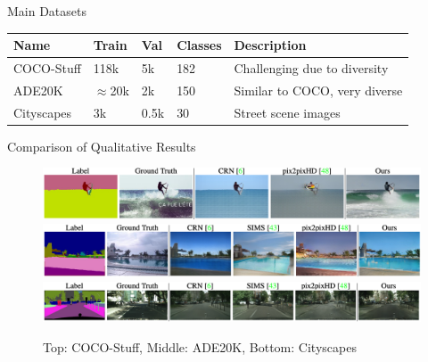 \documentclass{beamer}
\begin{document}
\begin{frame}{Main Datasets}
    \begin{table}[]
    \begin{tabular}{|l|l|l|l|l|}
    \hline
    \textbf{Name} & \textbf{Train} & \textbf{Val} & \textbf{Classes} & \textbf{Description}             \\ \hline
    COCO-Stuff    & 118k           & 5k           & 182              & Challenging due to diversity \\ \hline
    ADE20K        & $\approx$20k          & 2k           & 150              & Similar to COCO, very diverse    \\ \hline
    Cityscapes    & 3k             & 0.5k          & 30               & Street scene images              \\ \hline
    \end{tabular}
    \end{table}
\end{frame}

\begin{frame}{Comparison of Qualitative Results}
    \begin{figure}
        \centering
        \includegraphics[width=0.93\linewidth]{figures/results_coco.png}
        \vspace{0.3cm}
        \includegraphics[width=0.93\linewidth]{figures/results_ade-20k.png}
        \vspace{0.3cm}
        \includegraphics[width=0.93\linewidth]{figures/results_cityscapes.png} 
        \caption{Top: COCO-Stuff, Middle: ADE20K, Bottom: Cityscapes}
    \end{figure}
\end{frame}
\end{document}
